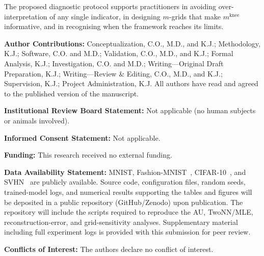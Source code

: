 \documentclass[make,article,submit,pdftex,moreauthors]{Definitions/mdpi}
\newcommand{\mknee}{m^{\mathrm{knee}}}
\begin{document}
The proposed diagnostic protocol supports practitioners in avoiding
over-interpretation of any single indicator, in designing $m$-grids that make
$\mknee$ informative, and in recognising when the framework reaches its limits.

\vspace{1ex}
\noindent\textbf{Author Contributions:}
Conceptualization, C.O., M.D., and K.J.;
Methodology, K.J.;
Software, C.O. and M.D.;
Validation, C.O., M.D., and K.J.;
Formal Analysis, K.J.;
Investigation, C.O. and M.D.;
Writing---Original Draft Preparation, K.J.;
Writing---Review \& Editing, C.O., M.D., and K.J.;
Supervision, K.J.;
Project Administration, K.J.
All authors have read and agreed to the published version of the manuscript.

\noindent\textbf{Institutional Review Board Statement:} Not applicable
(no human subjects or animals involved).

\noindent\textbf{Informed Consent Statement:} Not applicable.

\noindent\textbf{Funding:} This research received no external funding.

\noindent\textbf{Data Availability Statement:}
MNIST, Fashion-MNIST~\cite{lecun1998}, CIFAR-10~\cite{krizhevsky2009learning},
and SVHN~\cite{netzer2011reading} are publicly available.
Source code, configuration files, random seeds, trained-model logs, and
numerical results supporting the tables and figures will be deposited in a
public repository (GitHub/Zenodo) upon publication. The repository will include the scripts required to reproduce the AU, TwoNN/MLE, reconstruction-error, and grid-sensitivity analyses.
Supplementary material including full experiment logs is provided with this
submission for peer review.

\noindent\textbf{Conflicts of Interest:} The authors declare no conflict of interest.
\end{document}
